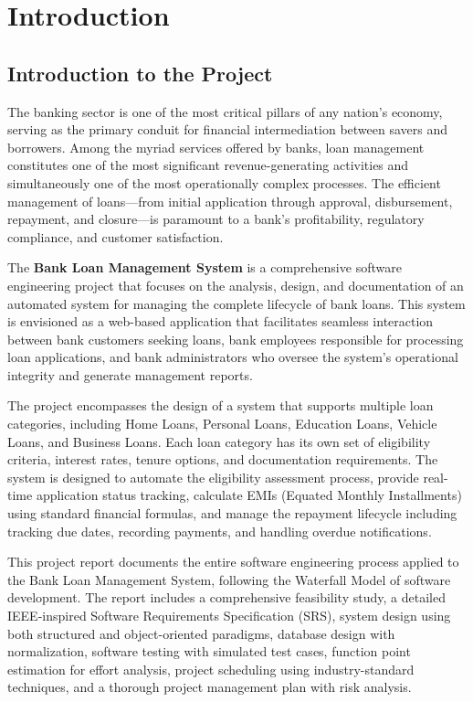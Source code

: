 \chapter{Introduction}

\section{Introduction to the Project}

The banking sector is one of the most critical pillars of any nation's economy, serving as the primary conduit for financial intermediation between savers and borrowers. Among the myriad services offered by banks, loan management constitutes one of the most significant revenue-generating activities and simultaneously one of the most operationally complex processes. The efficient management of loans—from initial application through approval, disbursement, repayment, and closure—is paramount to a bank's profitability, regulatory compliance, and customer satisfaction.

The \textbf{Bank Loan Management System} is a comprehensive software engineering project that focuses on the analysis, design, and documentation of an automated system for managing the complete lifecycle of bank loans. This system is envisioned as a web-based application that facilitates seamless interaction between bank customers seeking loans, bank employees responsible for processing loan applications, and bank administrators who oversee the system's operational integrity and generate management reports.

The project encompasses the design of a system that supports multiple loan categories, including Home Loans, Personal Loans, Education Loans, Vehicle Loans, and Business Loans. Each loan category has its own set of eligibility criteria, interest rates, tenure options, and documentation requirements. The system is designed to automate the eligibility assessment process, provide real-time application status tracking, calculate EMIs (Equated Monthly Installments) using standard financial formulas, and manage the repayment lifecycle including tracking due dates, recording payments, and handling overdue notifications.

This project report documents the entire software engineering process applied to the Bank Loan Management System, following the Waterfall Model of software development. The report includes a comprehensive feasibility study, a detailed IEEE-inspired Software Requirements Specification (SRS), system design using both structured and object-oriented paradigms, database design with normalization, software testing with simulated test cases, function point estimation for effort analysis, project scheduling using industry-standard techniques, and a thorough project management plan with risk analysis.

